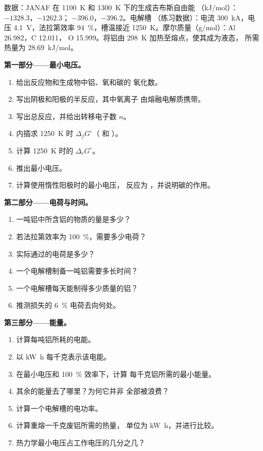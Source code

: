 \begin{problem}
\label{pb:b2:batteries-electrolysis:1}
数据：JANAF 在 \qty{1100}{K} 和 \qty{1300}{K} 下的生成吉布斯自由能
（\unit{kJ/mol}）： $-1328.3$，$-1262.3$； $-396.0$，$-396.2$。电解槽
（练习数据）：电流 \qty{300}{kA}，电压 \qty{4.1}{V}，法拉第效率
94~\%，槽温接近 \qty{1250}{K}。摩尔质量（\unit{g/mol}）：Al 26.982，C 12.011，
O 15.999。将铝由 \qty{298}{K} 加热至熔点，使其成为液态，
所需热量为 \qty{28.69}{kJ/mol}。

\medskip
\noindent\textbf{第一部分——最小电压。}
\begin{enumerate}
  \item 给出反应物和生成物中铝、氧和碳的
        氧化数。
  \item 写出阴极和阳极的半反应，其中氧离子
         由熔融电解质携带。
  \item 写出总反应，并给出转移电子数 $n$。
  \item 内插求 \qty{1250}{K} 时 $\Delta_f G^\circ$（ 和 ）。
  \item 计算 \qty{1250}{K} 时的 $\Delta_r G^\circ$。
  \item 推出最小电压。
  \item 计算使用惰性阳极时的最小电压，
        反应为 ，并说明碳的作用。
\end{enumerate}

\medskip
\noindent\textbf{第二部分——电荷与时间。}
\begin{enumerate}[resume]
  \item 一吨铝中所含铝的物质的量是多少？
  \item 若法拉第效率为 100~\%，需要多少电荷？
  \item 实际通过的电荷是多少？
  \item 一个电解槽制备一吨铝需要多长时间？
  \item 一个电解槽每天能制得多少质量的铝？
  \item 推测损失的 6~\% 电荷去向何处。
\end{enumerate}

\medskip
\noindent\textbf{第三部分——能量。}
\begin{enumerate}[resume]
  \item 计算每吨铝所耗的电能。
  \item 以 \unit{kW.h} 每千克表示该电能。
  \item 在最小电压和 100~\% 效率下，计算
        每千克铝所需的最小能量。
  \item 其余的能量去了哪里？为何它并非
        全部被浪费？
  \item 计算一个电解槽的电功率。
  \item 计算重熔一千克废铝所需的热量，
        单位为 \unit{kW.h}，并进行比较。
  \item 热力学最小电压占工作电压的几分之几？
\end{enumerate}


\end{problem}
